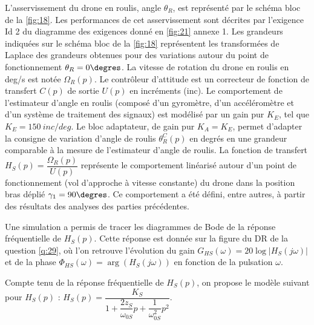 L’asservissement du drone en roulis, angle $\theta_R$, est représenté par le schéma bloc de la
\autoref{fig:18}. Les performances de cet asservissement sont décrites par l’exigence Id 2 du
diagramme des exigences donné en \autoref{fig:21} annexe 1. Les grandeurs indiquées sur le
schéma bloc de la \autoref{fig:18} représentent les transformées de Laplace des grandeurs obtenues pour des variations autour du point de fonctionnement $\theta_R = 0\degres$. La vitesse de rotation du
drone en roulis en \si{deg/s} est notée $\Omega_R(p)$. Le contrôleur d’attitude est un correcteur de fonction de transfert $C(p)$ de sortie $U(p)$ en incréments (inc). Le comportement de l’estimateur
d’angle en roulis (composé d’un gyromètre, d’un accéléromètre et d’un système de traitement des signaux) est modélisé par un gain pur $K_E$, tel que $K_E = \SI{150}{inc/deg}$.
Le bloc adaptateur, de gain pur $K_A = K_E$, permet d’adapter la consigne de variation d’angle
de roulis $\theta_R^C(p)$ en degrés en une grandeur comparable à la mesure de l’estimateur d’angle
de roulis.
La fonction de transfert $H_S (p) = \dfrac{\Omega_R(p)}{U(p)}$ représente le comportement linéarisé autour d’un
point de fonctionnement (vol d’approche à vitesse constante) du drone dans la position bras
déplié $\gamma_1 = 90\degres$. Ce comportement a été défini, entre autres, à partir des résultats des analyses des parties précédentes.


Une simulation a permis de tracer les diagrammes de Bode de la réponse fréquentielle de
$H_S (p)$. Cette réponse est donnée sur la figure du DR de la question \ref{q:29}, où l’on retrouve l’évolution du
gain $G_{HS}(\omega) = 20 \log |H_S (j\omega)|$ et de la phase $\Phi_{HS} (\omega) = \arg\left(H_S (j\omega)\right)$ en fonction de la pulsation $\omega$.

Compte tenu de la réponse fréquentielle de $H_S (p)$, on propose le modèle suivant pour $H_S (p)$ :
$H_S(p)=\dfrac{K_S}{1+\dfrac{2z_S}{\omega_{0S}}p+\dfrac{1}{\omega_{0S}^2}p^2}$.


\ifprof
\begin{corrige}
\end{corrige}
\else
\fi


\ifprof
\begin{corrige}
\end{corrige}
\else
\fi

